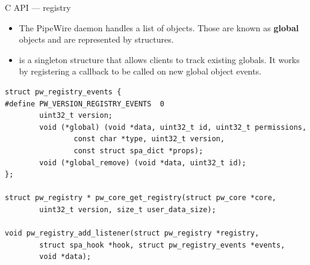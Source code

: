 \begin{frame}[fragile]{C API — registry}
  \begin{itemize}

  \item The PipeWire daemon handles a list of objects. Those are
    known as \textbf{global} objects and are represented by
     structures.

  \item {} is a singleton structure that allows clients
    to track existing globals. It works by registering a callback to be
    called on new global object events.

  \end{itemize}

      \begin{block}{}
        \fontsize{9}{9}\selectfont
          \begin{verbatim}
struct pw_registry_events {
#define PW_VERSION_REGISTRY_EVENTS  0
        uint32_t version;
        void (*global) (void *data, uint32_t id, uint32_t permissions,
                const char *type, uint32_t version,
                const struct spa_dict *props);
        void (*global_remove) (void *data, uint32_t id);
};

struct pw_registry * pw_core_get_registry(struct pw_core *core,
        uint32_t version, size_t user_data_size);

void pw_registry_add_listener(struct pw_registry *registry,
        struct spa_hook *hook, struct pw_registry_events *events,
        void *data);
          \end{verbatim}
      \end{block}
\end{frame}



